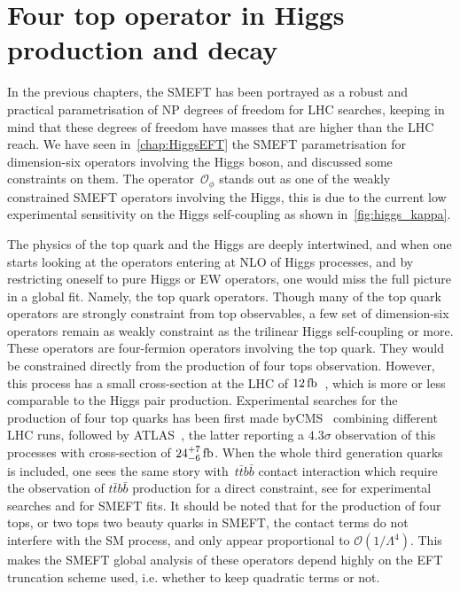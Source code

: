 

\chapter{ Four top operator in Higgs production and decay}\label{chap:4topSingleHiggs}
%
\par In the previous chapters, the SMEFT has been portrayed as  a robust and practical parametrisation of NP degrees of freedom for LHC searches, keeping in mind that these degrees of freedom have masses that are higher than the LHC reach. We have seen in~\autoref{chap:HiggsEFT} the SMEFT parametrisation for dimension-six operators involving the Higgs boson, and discussed some constraints on them. The operator~$ \mathcal O _{\phi}$ stands out as one of the weakly constrained SMEFT operators involving the Higgs, this is due to the current low experimental sensitivity on the Higgs self-coupling as shown in~\autoref{fig:higgs_kappa}. 
\par The physics of the top quark and the Higgs are deeply intertwined, and when one starts looking at the operators entering at NLO of Higgs processes,  and by restricting oneself to pure Higgs or EW operators, one would miss the full picture in a global fit. Namely, the top quark operators. Though many of the top quark operators are strongly constraint from top observables, a few set of dimension-six operators remain as weakly constraint as the trilinear Higgs self-coupling or more. These operators are four-fermion operators involving the top quark. They would be constrained directly from the production of four tops observation. However, this process has a small cross-section at the LHC of $12\, \femtobarn$~\cite{Frederix:2017wme}, which is more or less comparable to the Higgs pair production. Experimental searches for the production of four top quarks has been first made byCMS~\cite{Sirunyan:2019nxl} combining different LHC runs, followed by ATLAS~\cite{Aad:2020klt}, the latter reporting a $4.3 \sigma$ observation of this processes with cross-section of $24^{+7}_{-6}\,\femtobarn$. When the whole third generation quarks is included, one sees the same story with~$t\bar{t}b\bar{b}$  contact interaction which require the observation of $t\bar{t}b\bar{b}$ production for a direct constraint, see \cite{Sirunyan:2020kgar, ATLAS:2018gug} for experimental searches and \cite{DHondt:2018cww, Hartland:2019bjb} for SMEFT fits. It should be noted that for the production of four tops, or two tops two beauty quarks in SMEFT, the contact terms do not interfere with the SM process, and only appear proportional to $\mathcal{O}(1/\Lambda^4)$. This makes the SMEFT global analysis of these operators depend highly on the EFT truncation scheme used, i.e. whether to keep quadratic terms or not. 
